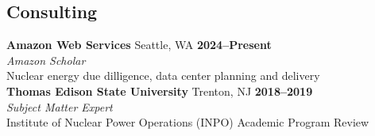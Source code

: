 \documentclass[margin,line]{resume}
\begin{document}
\begin{resume}
    \section{\mysidestyle Consulting}


    \textbf{Amazon Web Services} Seattle, WA \hfill
    \textbf{2024--Present}\\
    \textsl{Amazon Scholar} \\
    Nuclear energy due dilligence, data center planning and delivery \\

    \textbf{Thomas Edison State University} Trenton, NJ \hfill
    \textbf{2018--2019}\\
    \textsl{Subject Matter Expert} \\
    Institute of Nuclear Power Operations (INPO) Academic Program Review\\











\end{resume}
\end{document}
